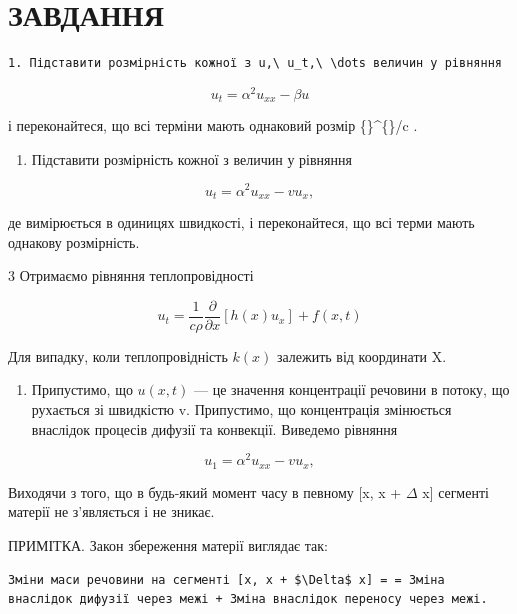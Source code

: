 \documentclass[
  ukrainian,
]{article}
\providecommand{\tightlist}{%
  \setlength{\itemsep}{0pt}\setlength{\parskip}{0pt}}
\begin{document}
\section{ЗАВДАННЯ}\label{ux437ux430ux432ux434ux430ux43dux43dux44f-2}

\begin{verbatim}
1. Підставити розмірність кожної з u,\ u_t,\ \dots величин у рівняння
\end{verbatim}

\[
u_t = \alpha^2 u_{xx} - \beta u
\]

і переконайтеся, що всі терміни мають однаковий розмір
\{\}\^{}\{\circ\}/c .

\begin{enumerate}
\def\labelenumi{\arabic{enumi}.}
\setcounter{enumi}{1}
\tightlist
\item
  Підставити розмірність кожної з величин у рівняння
\end{enumerate}

\[
u_t = \alpha^2 u_{xx} - v u_x,
\]

де \upsilon вимірюється в одиницях швидкості, і переконайтеся, що всі
терми мають однакову розмірність.

3 Отримаємо рівняння теплопровідності

\[
u_{t} = \frac{1}{c\rho} \frac{\partial}{\partial x} [h(x) u_{x}] + f(x, t)
\]

Для випадку, коли теплопровідність \(k\left( x\right)\) залежить від
координати X.

\begin{enumerate}
\def\labelenumi{\arabic{enumi}.}
\setcounter{enumi}{3}
\tightlist
\item
  Припустимо, що \(u(x, t)\) --- це значення концентрації речовини в
  потоку, що рухається зі швидкістю v. Припустимо, що концентрація
  змінюється внаслідок процесів дифузії та конвекції. Виведемо рівняння
\end{enumerate}

\[
u_1 = \alpha^2 u_{xx} - v u_x,
\]

Виходячи з того, що в будь-який момент часу в певному {[}x, x +
\(\Delta\) x{]} сегменті матерії не з'являється і не зникає.

ПРИМІТКА. Закон збереження матерії виглядає так:

\begin{verbatim}
Зміни маси речовини на сегменті [x, x + $\Delta$ x] = = Зміна внаслідок дифузії через межі + Зміна внаслідок переносу через межі.
\end{verbatim}
\end{document}
